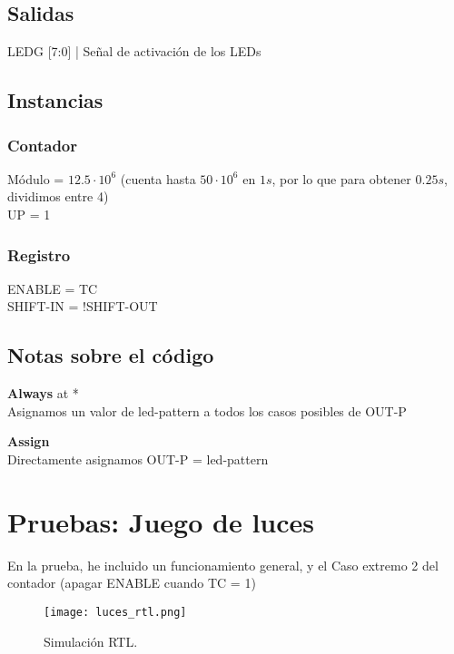 \documentclass{article}
\newcommand{\iconpath}{/home/khz/git/tabler-icons/icons/outline-white/}
\newcommand{\icon}[1]{}
\begin{document}
\subsection{Salidas}
\icon{matrix} LEDG [7:0] | Señal de activación de los LEDs
\subsection{Instancias}
\subsubsection{Contador}
Módulo = $12.5 \cdot 10^6$ (cuenta hasta $50 \cdot 10^6$ en $1s$, por lo que para obtener $0.25s$, dividimos entre 4)\\
UP = 1
\subsubsection{Registro}
ENABLE = TC \\
SHIFT-IN = !SHIFT-OUT
\subsection{Notas sobre el código}
\textbf{Always} at * \\
Asignamos un valor de led-pattern a todos los casos posibles de OUT-P \\

\begin{flushleft}
\textbf{Assign} \\
Directamente asignamos OUT-P = led-pattern
\end{flushleft}
\newpage
\section{Pruebas: Juego de luces}
En la prueba, he incluido un funcionamiento general, y el Caso extremo 2 del contador (apagar ENABLE cuando TC = 1)
\begin{figure}[h!]
    \centering
    \texttt{[image: luces\_rtl.png]} 
    \caption{Simulación RTL.}
\end{figure}
\end{document}
